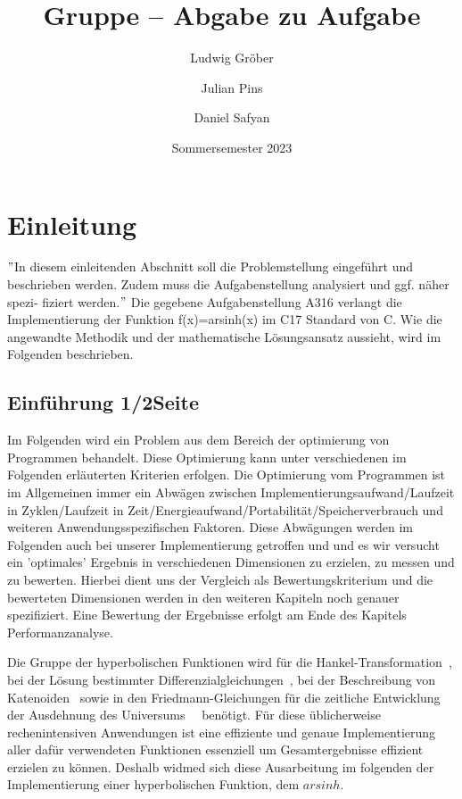 \documentclass[course=erap]{aspdoc}
\author{Ludwig Gröber \and Julian Pins \and Daniel Safyan}
\date{Sommersemester 2023} %
\title{Gruppe \theGroup{} -- Abgabe zu Aufgabe \theNumber}
\begin{document}
    \maketitle


    \section{Einleitung}
    \("\)In diesem einleitenden Abschnitt soll die Problemstellung eingeführt und beschrieben werden.
    Zudem muss die Aufgabenstellung analysiert und ggf. näher spezi- fiziert werden.\("\)\n
    Die gegebene Aufgabenstellung A316 verlangt die Implementierung der Funktion f(x)=arsinh(x) im C17 Standard von C.
    Wie die angewandte Methodik und der mathematische Lösungsansatz aussieht, wird im Folgenden beschrieben.

    \subsection{Einführung 1/2Seite}
    Im Folgenden wird ein Problem aus dem Bereich der optimierung von Programmen behandelt.
    Diese Optimierung kann unter verschiedenen im Folgenden erläuterten Kriterien erfolgen.
    Die Optimierung vom Programmen ist im Allgemeinen immer ein Abwägen zwischen Implementierungsaufwand/Laufzeit in Zyklen/Laufzeit in Zeit/Energieaufwand/Portabilität/Speicherverbrauch und weiteren Anwendungsspezifischen Faktoren.
    Diese Abwägungen werden im Folgenden auch bei unserer Implementierung getroffen und und es wir versucht ein 'optimales' Ergebnis in verschiedenen Dimensionen zu erzielen, zu messen und zu bewerten.
    Hierbei dient uns der Vergleich als Bewertungskriterium und die bewerteten Dimensionen werden in den weiteren Kapiteln noch genauer spezifiziert.
    Eine Bewertung der Ergebnisse erfolgt am Ende des Kapitels Performanzanalyse.


    Die Gruppe der hyperbolischen Funktionen wird für die Hankel-Transformation~\cite{hankel},
    bei der Lösung bestimmter Differenzialgleichungen~\cite{differenzial}, bei der Beschreibung von Katenoiden~\cite{katenoid}
    sowie in den Friedmann-Gleichungen für die zeitliche Entwicklung der Ausdehnung des Universums~\cite{universum1,universum2}~ benötigt.
    Für diese üblicherweise rechenintensiven Anwendungen ist eine effiziente und genaue Implementierung aller dafür verwendeten Funktionen essenziell um Gesamtergebnisse effizient erzielen zu können.
    Deshalb widmed sich diese Ausarbeitung im folgenden der Implementierung einer hyperbolischen Funktion, dem $arsinh$.
\end{document}
